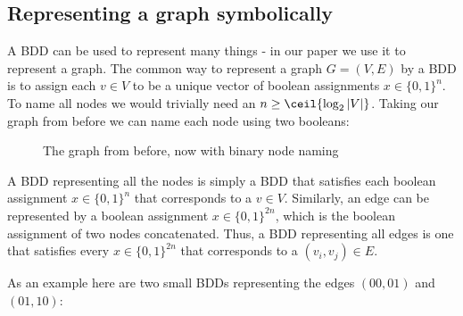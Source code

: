 \documentclass[../master/master.tex]{subfiles}
\begin{document}
\subsection{Representing a graph symbolically}
A BDD can be used to represent many things - in our paper we use it to represent a graph. The common way to represent a graph $G = (V, E)$ by a BDD is to assign each $v\in V$ to be a unique vector of boolean assignments $x\in\{0,1\}^n$. To name all nodes we would trivially need an $n \geq \ceil{\log_2{|V|}}$. Taking our graph from before we can name each node using two booleans:

\begin{figure}[H]
\center
{}
\caption{The graph from before, now with binary node naming}
\label{graphforbdd}
\end{figure}


A BDD representing all the nodes is simply a BDD that satisfies each boolean assignment $x\in\{0,1\}^n$ that corresponds to a $v\in V$. Similarly, an edge can be represented by a boolean assignment $x\in\{0,1\}^{2n}$, which is the boolean assignment of two nodes concatenated. Thus, a BDD representing all edges is one that satisfies every $x\in\{0,1\}^{2n}$ that corresponds to a $(v_i, v_j)\in E$.

As an example here are two small BDDs representing the edges $(00,01)$ and $(01,10)$:
\end{document}
